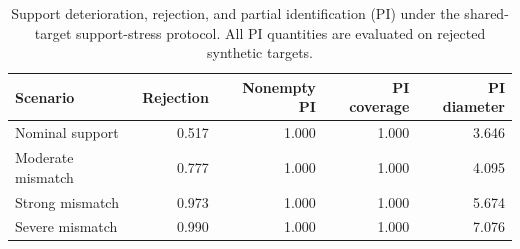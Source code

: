 \begin{table}[H]
\centering
\caption{Support deterioration, rejection, and partial identification (PI) under the shared-target support-stress protocol. All PI quantities are evaluated on rejected synthetic targets.}
\label{tab:v1-partial-id}
\begin{tabular}{lrrrr}
\toprule
Scenario & Rejection & Nonempty PI & PI coverage & PI diameter \\
\midrule
Nominal support & 0.517 & 1.000 & 1.000 & 3.646 \\
Moderate mismatch & 0.777 & 1.000 & 1.000 & 4.095 \\
Strong mismatch & 0.973 & 1.000 & 1.000 & 5.674 \\
Severe mismatch & 0.990 & 1.000 & 1.000 & 7.076 \\
\bottomrule
\end{tabular}
\end{table}
